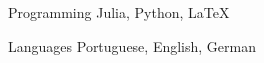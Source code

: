 

\begin{cvskills}

  \cvskill
    {Programming} %
    {Julia, Python, LaTeX} %

  \cvskill
    {Languages} %
    {Portuguese, English, German} %

\end{cvskills}
